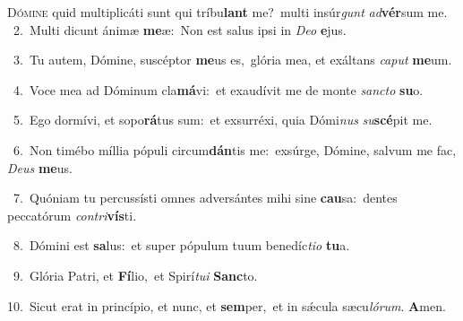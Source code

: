 \lettrine{\initial\textcolor{\initialcolor}{D}}{ómine} quid multiplicáti sunt qui tríbu\textbf{lant} me?~\star multi insúr\textit{gunt} \textit{ad}\-\textbf{vér}sum me.\\
{\numbfont\textcolor{\numbcolor}{~2.}}~Multi dicunt ánimæ \textbf{me}\-æ:~\star Non est salus ipsi in \textit{De}\-\textit{o} \textbf{e}\-jus.\par
{\numbfont\textcolor{\numbcolor}{~3.}}~Tu autem, Dómine, suscéptor \textbf{me}\-us es,~\star glória mea, et exáltans \textit{ca}\-\textit{put} \textbf{me}\-um.\par
{\numbfont\textcolor{\numbcolor}{~4.}}~Voce mea ad Dóminum cla\-\textbf{má}\-vi:~\star et exaudívit me de monte \textit{sanc}\-\textit{to} \textbf{su}\-o.\par
{\numbfont\textcolor{\numbcolor}{~5.}}~Ego dormívi, et sopo\-\textbf{rá}\-tus sum:~\star et exsurréxi, quia Dómi\textit{nus} \textit{su}\-\textbf{scé}pit me.\par
{\numbfont\textcolor{\numbcolor}{~6.}}~Non timébo míllia pópuli circum\-\textbf{dán}\-tis me:~\star exsúrge, Dómine, salvum me fac, \textit{De}\-\textit{us} \textbf{me}\-us.\par
{\numbfont\textcolor{\numbcolor}{~7.}}~Quóniam tu percussísti omnes adversántes mihi sine \textbf{cau}\-sa:~\star dentes peccatórum \textit{con}\-\textit{tri}\textbf{vís}ti.\par
{\numbfont\textcolor{\numbcolor}{~8.}}~Dómini est \textbf{sa}\-lus:~\star et super pópulum tuum benedíc\-\textit{ti}\-\textit{o} \textbf{tu}\-a.\par
{\numbfont\textcolor{\numbcolor}{~9.}}~Glória Patri, et \textbf{Fí}\-lio,~\star et Spirí\-\textit{tu}\-\textit{i} \textbf{Sanc}\-to.\par
{\numbfont\textcolor{\numbcolor}{10.}}~Sicut erat in princípio, et nunc, et \textbf{sem}\-per,~\star et in sǽcula sæcu\-\textit{ló}\-\textit{rum}. \textbf{A}\-men.\par
